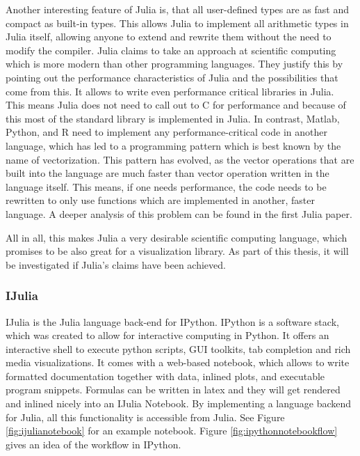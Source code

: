Another interesting feature of Julia is, that all user-defined types are as fast and compact as built-in types.
This allows Julia to implement all arithmetic types in Julia itself, allowing anyone to extend and rewrite them without the need to modify the compiler.
Julia claims to take an approach at scientific computing which is more modern than other programming languages.
They justify this by pointing out the performance characteristics of Julia and the possibilities that come from this\cite{2013arXiv1312.1431L}\cite{2012arXiv1209.5145B}. 
It allows to write even performance critical libraries in Julia. 
This means Julia does not need to call out to C for performance and because of this most of the standard library is implemented in Julia.
In contrast, Matlab, Python, and R need to implement any performance-critical code in another language, which has led to a programming pattern which is best known by the name of vectorization\cite{2012arXiv1209.5145B}. This pattern has evolved, as the vector operations that are built into the language are much faster than vector operation written in the language itself.
This means, if one needs performance, the code needs to be rewritten to only use functions which are implemented in another, faster language.
A deeper analysis of this problem can be found in the first Julia paper\cite{2012arXiv1209.5145B}.

All in all, this makes Julia a very desirable scientific computing language, which promises to be also great for a visualization library.
As part of this thesis, it will be investigated if Julia's claims\cite{WhyJulia} have been achieved.



\subsubsection{IJulia}
IJulia\cite{IJulia} is the Julia language back-end for IPython.
IPython is a software stack, which was created to allow for interactive computing in Python.
It offers an interactive shell to execute python scripts, \ac{GUI} toolkits, tab completion and rich media visualizations.
It comes with a web-based notebook, which allows to write formatted documentation together with data, inlined plots, and executable program snippets. 
Formulas can be written in latex and they will get rendered and inlined nicely into an IJulia Notebook. By implementing a language backend for Julia, all this functionality is accessible from Julia.
See Figure \ref{fig:ijulianotebook} for an example notebook. Figure \ref{fig:ipythonnotebookflow} gives an idea of the workflow in IPython.

